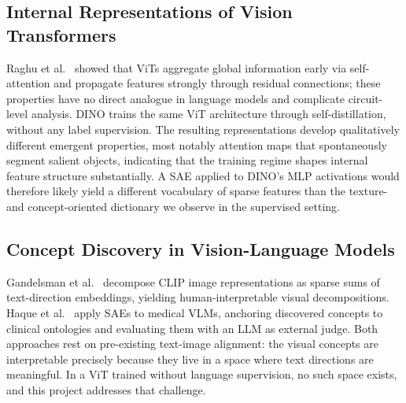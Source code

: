 \subsection{Internal Representations of Vision Transformers}
Raghu et al.\ \cite{Raghu2021} showed that ViTs aggregate global information early via self-attention and propagate features strongly through residual connections; these properties have no direct analogue in language models and complicate circuit-level analysis. DINO \cite{Caron2021} trains the same ViT architecture through self-distillation, without any label supervision. The resulting representations develop qualitatively different emergent properties, most notably attention maps that spontaneously segment salient objects, indicating that the training regime shapes internal feature structure substantially. A SAE applied to DINO's MLP activations would therefore likely yield a different vocabulary of sparse features than the texture- and concept-oriented dictionary we observe in the supervised setting.

\subsection{Concept Discovery in Vision-Language Models}
Gandelsman et al.\ \cite{Gandelsman2024} decompose CLIP image representations as sparse sums of text-direction embeddings, yielding human-interpretable visual decompositions. Haque et al.\ \cite{Haque2026} apply SAEs to medical VLMs, anchoring discovered concepts to clinical ontologies and evaluating them with an LLM as external judge. Both approaches rest on pre-existing text-image alignment: the visual concepts are interpretable precisely because they live in a space where text directions are meaningful. In a ViT trained without language supervision, no such space exists, and this project addresses that challenge.
